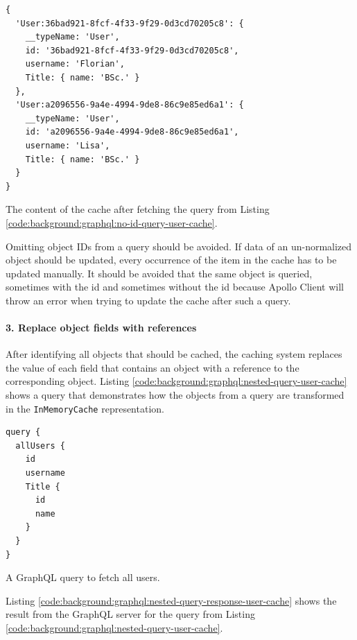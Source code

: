 \ifshowListings
\begin{listing}[H]
  \begin{verbatim}
{
  'User:36bad921-8fcf-4f33-9f29-0d3cd70205c8': {
    __typeName: 'User',
    id: '36bad921-8fcf-4f33-9f29-0d3cd70205c8',
    username: 'Florian',
    Title: { name: 'BSc.' }
  },
  'User:a2096556-9a4e-4994-9de8-86c9e85ed6a1': {
    __typeName: 'User',
    id: 'a2096556-9a4e-4994-9de8-86c9e85ed6a1',
    username: 'Lisa',
    Title: { name: 'BSc.' }
  }
}
  \end{verbatim}
  \caption{The content of the cache after fetching the query from Listing \ref{code:background:graphql:no-id-query-user-cache}.}\label{code:background:graphql:no-id-query-user-cache-representation}
\end{listing}
\fi

\noindent Omitting object \acp{ID} from a query should be avoided. If data of an un-normalized object should be updated, every occurrence of the item in the cache has to be updated manually. It should be avoided that the same object is queried, sometimes with the id and sometimes without the id because Apollo Client will throw an error when trying to update the cache after such a query.

\paragraph{3. Replace object fields with references}\label{paragraph:background:graphql:apollo-server-client:data-normalization:replace-object-fields-with-references}

After identifying all objects that should be cached, the caching system replaces the value of each field that contains an object with a reference to the corresponding object. Listing \ref{code:background:graphql:nested-query-user-cache} shows a query that demonstrates how the objects from a query are transformed in the \texttt{InMemoryCache} representation.

\ifshowListings
\begin{listing}[H]
  \begin{verbatim}
query {
  allUsers {
    id
    username
    Title {
      id
      name
    }
  }
}
  \end{verbatim}
  \caption{A GraphQL query to fetch all users.}\label{code:background:graphql:nested-query-user-cache}
\end{listing}
\fi

Listing \ref{code:background:graphql:nested-query-response-user-cache} shows the result from the GraphQL server for the query from Listing \ref{code:background:graphql:nested-query-user-cache}.

